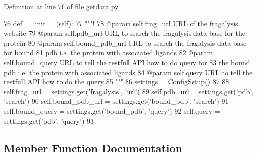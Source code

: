 Definition at line 76 of file getdata.\+py.


\begin{DoxyCode}
76     \textcolor{keyword}{def }\_\_init\_\_(self):
77         \textcolor{stringliteral}{"""!}
78 \textcolor{stringliteral}{        @param self.frag\_url URL of the fragalysis website}
79 \textcolor{stringliteral}{        @param self.pdb\_url URL to search the fragalysis data base for the protein}
80 \textcolor{stringliteral}{        @param self.bound\_pdb\_url URL to search the fragalysis data base for bound}
81 \textcolor{stringliteral}{        pdb i.e. the protein with associated ligands}
82 \textcolor{stringliteral}{        @param self.bound\_query URL to tell the restfull API how to do query for}
83 \textcolor{stringliteral}{        the bound pdb i.e. the protein with associated ligands}
84 \textcolor{stringliteral}{        @param self.query URL to tell the restfull API how to do the query}
85 \textcolor{stringliteral}{        """}
86         settings = \hyperlink{namespacefragalysis__api_1_1xcglobalscripts_1_1set__config_a9b5445f82604ad45c1e85e2b07e4a317}{ConfigSetup}()
87 
88         self.frag\_url = settings.get(\textcolor{stringliteral}{'fragalysis'}, \textcolor{stringliteral}{'url'})
89         self.pdb\_url = settings.get(\textcolor{stringliteral}{'pdb'}, \textcolor{stringliteral}{'search'})
90         self.bound\_pdb\_url = settings.get(\textcolor{stringliteral}{'bound\_pdb'}, \textcolor{stringliteral}{'search'})
91         self.bound\_query = settings.get(\textcolor{stringliteral}{'bound\_pdb'}, \textcolor{stringliteral}{'query'})
92         self.query = settings.get(\textcolor{stringliteral}{'pdb'}, \textcolor{stringliteral}{'query'})
93 
\end{DoxyCode}


\subsection{Member Function Documentation}
\mbox{\label{classfragalysis__api_1_1xcextracter_1_1getdata_1_1_get_pdb_data_a1785640f7d8841b41773f04577065366}} 
